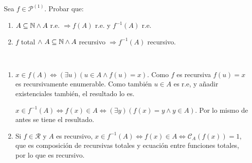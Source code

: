 \documentclass[twoside]{article}
\newcommand{\sii}{{\Leftrightarrow}}
\begin{document}
\begin{ejercicio}{4}
Sea $f \in \mathcal{P}^{(1)}$. Probar que:
\begin{enumerate}
	\item $A \subseteq \mathbb{N} \land A$ r.e. $\Rightarrow f(A)$ r.e. y $f^{-1}(A)$ r.e.
	\item $f$ total $\land\ A \subseteq \mathbb{N} \land A$ recursivo $\Rightarrow f^{-1}(A)$ recursivo.
\end{enumerate}
\end{ejercicio}
\begin{solucion}\
\begin{enumerate}
\item $x\in f(A)\sii (\exists u) (u\in A\land f(u)=x)$. Como $f$ es recursiva $f(u)=x$ es recursivamente enumerable. Como también $u\in A$ es r.e, y añadir existenciales también, el resultado lo es. 

$x\in f^{-1}(A)\sii f(x)\in A\sii (\exists y) (f(x)=y\land y\in A)$. Por lo mismo de antes se tiene el resultado. 

\item Si $f\in\mathcal{R}$ y $A$ es recursivo, $x\in f^{-1}(A)\sii f(x)\in A\sii \mathcal{C}_A(f(x))=1$, que es composición de recursivas totales y ecuación entre funciones totales, por lo que es recursivo.
\end{enumerate}
\end{solucion}

\newpage
\end{document}

